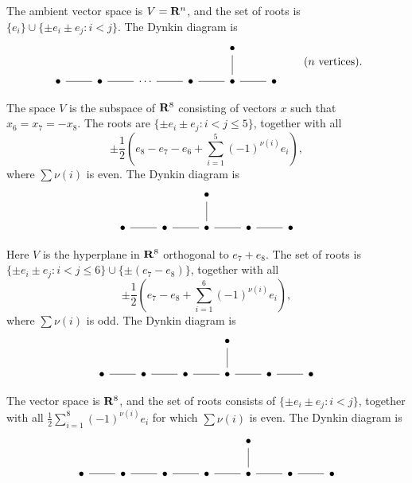 \begin{example}\label{eg:typeD}
The ambient vector space is $V=\mathbf{R}^n$, and the set of roots is 
$\{e_i\}\cup \{\pm e_i\pm e_j:i<j\}$. The Dynkin diagram is 
\[
\begin{tikzcd}
  & & & & \bullet \\
  \bullet \ar[r, dash]
    & \bullet \ar[r, dash] 
    & \cdots \ar[r, dash]
    & \bullet \ar[r, dash]
    & \bullet \ar[r, dash] \ar[u, dash] 
    & \bullet
\end{tikzcd}
\qquad\text{($n$ vertices)} .
\]
\end{example}

\begin{example}
The space $V$ is the subspace of $\mathbf{R}^8$ consisting of vectors $x$ such that 
$x_6=x_7=-x_8$. The roots are $\{\pm e_i\pm e_j:i<j\leqslant 5\}$, together 
with all 
\[
  \pm \frac 1 2\left(e_8-e_7-e_6 + \sum_{i=1}^5 (-1)^{\nu(i)} e_i\right) ,
\]
where $\sum \nu(i)$ is even. The Dynkin diagram is 
\[\begin{tikzcd}
  & & \bullet \\
  \bullet \ar[r, dash] 
    & \bullet \ar[r, dash]
    & \bullet \ar[r, dash] \ar[u, dash]
    & \bullet \ar[r, dash] 
    & \bullet 
\end{tikzcd}\]
\end{example}

\begin{example}
Here $V$ is the hyperplane in $\mathbf{R}^8$ orthogonal to $e_7+e_8$. The set of 
roots is $\{\pm e_i\pm e_j:i<j\leqslant 6\}\cup\{\pm (e_7-e_8)\}$, together 
with all 
\[
  \pm \frac 1 2\left(e_7-e_8+\sum_{i=1}^6 (-1)^{\nu(i)} e_i\right) ,
\]
where $\sum \nu(i)$ is odd. The Dynkin diagram is 
\[\begin{tikzcd}
  & & & \bullet \\
  \bullet \ar[r, dash] 
    & \bullet \ar[r, dash]
    & \bullet \ar[r, dash]
    & \bullet \ar[r, dash] \ar[u, dash]
    & \bullet \ar[r, dash] 
    & \bullet 
\end{tikzcd}\]
\end{example}

\begin{example}
The vector space is $\mathbf{R}^8$, and the set of roots consists of 
$\{\pm e_i\pm e_j:i<j\}$, together with all 
$\frac 1 2 \sum_{i=1}^8 (-1)^{\nu(i)} e_i$ for which $\sum \nu(i)$ is even. The 
Dynkin diagram is 
\[\begin{tikzcd}
  & & & & \bullet \\
  \bullet \ar[r, dash] 
    & \bullet \ar[r, dash]
    & \bullet \ar[r, dash]
    & \bullet \ar[r, dash]
    & \bullet \ar[r, dash] \ar[u, dash]
    & \bullet \ar[r, dash] 
    & \bullet 
\end{tikzcd}\]
\end{example}

